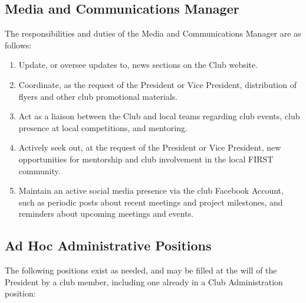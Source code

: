 \documentclass[english,11pt]{article}
\begin{document}
\subsection{Media and Communications Manager}
The responsibilities and duties of the Media and Communications Manager are as follows:

\begin{enumerate}[label=\Alph*.]
\item Update, or oversee updates to, news sections on the Club website.
\item Coordinate, as the request of the President or Vice President, distribution of flyers and other club promotional materials.
\item Act as a liaison between the Club and local teams regarding club events, club presence at local competitions, and mentoring.
\item Actively seek out, at the request of the President or Vice President, new opportunities for mentorship and club involvement in the local FIRST community.
\item Maintain an active social media presence via the club Facebook Account, such as periodic posts about recent meetings and project milestones, and reminders about upcoming meetings and events.
\end{enumerate}

\subsection{Ad Hoc Administrative Positions}
The following positions exist as needed, and may be filled at the will of the President by a club member, including one already in a Club Administration position:
\end{document}
